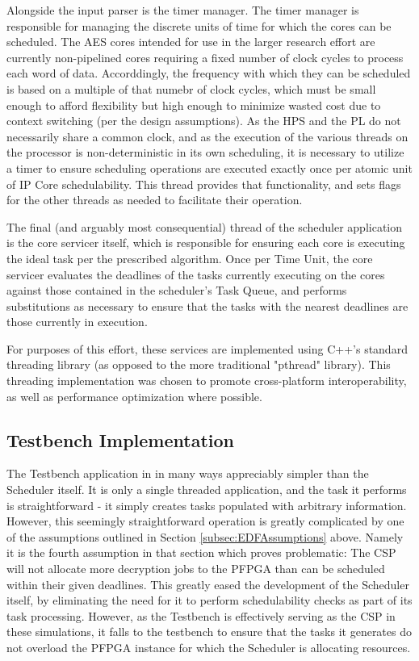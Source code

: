 Alongside the input parser is the timer manager. The timer manager is responsible for managing the discrete units of time for which the cores can be scheduled. The AES cores intended for use in the larger research effort are currently non-pipelined cores requiring a fixed number of clock cycles to process each word of data. Accorddingly, the frequency with which they can be scheduled is based on a multiple of that numebr of clock cycles, which must be small enough to afford flexibility but high enough to minimize wasted cost due to context switching (per the design assumptions). As the HPS and the PL do not necessarily share a common clock, and as the execution of the various threads on the processor is non-deterministic in its own scheduling, it is necessary to utilize a timer to ensure scheduling operations are executed exactly once per atomic unit of IP Core schedulability. This thread provides that functionality, and sets flags for the other threads as needed to facilitate their operation.

The final (and arguably most consequential) thread of the scheduler application is the core servicer itself, which is responsible for ensuring each core is executing the ideal task per the prescribed algorithm. Once per Time Unit, the core servicer evaluates the deadlines of the tasks currently executing on the cores against those contained in the scheduler's Task Queue, and performs substitutions as necessary to ensure that the tasks with the nearest deadlines are those currently in execution. 

For purposes of this effort, these services are implemented using C++'s standard threading library (as opposed to the more traditional "pthread" library). This threading implementation was chosen to promote cross-platform interoperability, as well as performance optimization where possible.


\subsection{Testbench Implementation}\label{subsec:TestbenchImpl}
The Testbench application in in many ways appreciably simpler than the Scheduler itself. It is only a single threaded application, and the task it performs is straightforward - it simply creates tasks populated with arbitrary information. However, this seemingly straightforward operation is greatly complicated by one of the assumptions outlined in Section \ref{subsec:EDFAssumptions} above. Namely it is the fourth assumption in that section which proves problematic: The CSP will not allocate more decryption jobs to the PFPGA than can be scheduled within their given deadlines. This greatly eased the development of the Scheduler itself, by eliminating the need for it to perform schedulability checks as part of its task processing. However, as the Testbench is effectively serving as the CSP in these simulations, it falls to the testbench to ensure that the tasks it generates do not overload the PFPGA instance for which the Scheduler is allocating resources.

